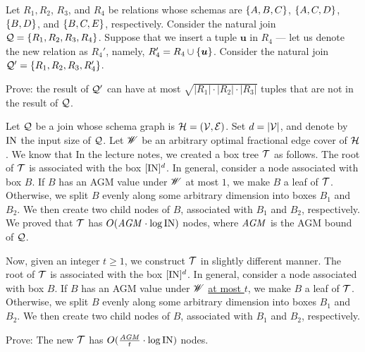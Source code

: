 \pagebreak

 Let $R_1, R_2$, $R_3$, and $R_4$ be relations whose schemas are $\{A, B, C\}$, $\{A, C, D\}$, $\{B, D\}$, and $\{B, C, E\}$, respectively. Consider the natural join $\mathcal{Q} = \{R_1, R_2, R_3, R_4\}$. Suppose that we insert a tuple $\bm{u}$ in $R_4$ --- let us denote the new relation as $R_4'$, namely, $R_4' = R_4 \cup \{\textrm{\boldmath${u}$}\}$. Consider the natural join $\mathcal{Q}' = \{R_1, R_2, R_3, R_4'\}$.

\vgap

Prove: the result of $\mathcal{Q}'$ can have at most $\sqrt{|R_1| \cdot |R_2| \cdot |R_3|}$ tuples that are not in the result of $\mathcal{Q}$.

\pagebreak

 Let $\mathcal{Q}$ be a join whose schema graph is $\mathcal{H} = (\mathcal{V}, \mathcal{E})$. Set $d = |\mathcal{V}|$, and denote by $\text{IN}$ the input size of $\mathcal{Q}$. Let $\mathscr{W}$ be an arbitrary optimal fractional edge cover of $\mathcal{H}$. We know that
In the lecture notes, we created a box tree $\mathcal{T}$ as follows. The root of $\mathcal{T}$ is associated with the box $[\text{IN}]^d$. In general, consider a node associated with box $B$. If $B$ has an AGM value under $\mathscr{W}$ at most $1$, we make $B$ a leaf of $\mathcal{T}$. Otherwise, we split $B$ evenly along some arbitrary dimension into boxes $B_1$ and $B_2$. We then create two child nodes of $B$, associated with $B_1$ and $B_2$, respectively. We proved that $\mathcal{T}$ has $O(\mathit{AGM} \cdot \log \text{IN})$ nodes, where $\mathit{AGM}$ is the AGM bound of $\mathcal{Q}$.

\vgap

Now, given an integer $t \ge 1$, we construct $\mathcal{T}$ in slightly different manner. The root of $\mathcal{T}$ is associated with the box $[\text{IN}]^d$. In general, consider a node associated with box $B$. If $B$ has an AGM value under $\mathscr{W}$ \uline{at most $t$}, we make $B$ a leaf of $\mathcal{T}$. Otherwise, we split $B$ evenly along some arbitrary dimension into boxes $B_1$ and $B_2$. We then create two child nodes of $B$, associated with $B_1$ and $B_2$, respectively.

\vgap

Prove: The new $\mathcal{T}$ has $O(\frac{\mathit{AGM}}{t} \cdot \log \text{IN})$ nodes.



